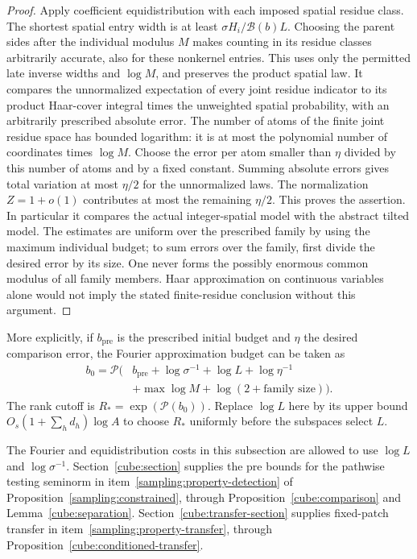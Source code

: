 \begin{proof}
Apply coefficient equidistribution with each imposed spatial residue class.
The shortest spatial entry width is at least
$\sigma H_i/\mathcal B(b)L$.  Choosing the parent sides after the
individual modulus $M$ makes counting in its residue classes arbitrarily
accurate, also for these nonkernel entries.  This uses only the permitted
late inverse widths and $\log M$, and preserves the product spatial law.
It compares the unnormalized expectation of every joint residue indicator
to its product Haar-cover integral times the unweighted spatial probability,
with an arbitrarily prescribed absolute error.  The number of atoms of
the finite joint residue space has bounded logarithm: it is at most the
polynomial number of coordinates times $\log M$.  Choose the error per atom smaller than
$\eta$ divided by this number of atoms and by a fixed constant.
Summing absolute errors gives total variation at most $\eta/2$ for the
unnormalized laws.  The normalization $Z=1+o(1)$ contributes at most the
remaining $\eta/2$.  This proves the assertion.  In particular it compares
the actual integer-spatial model with the abstract tilted model.  The
estimates are uniform over the prescribed family by using the maximum
individual budget; to sum errors over the family, first divide the desired
error by its size.  One never forms the possibly enormous common modulus
of all family members.  Haar approximation on continuous variables alone
would not imply the stated finite-residue conclusion without this argument.
\end{proof}

More explicitly, if $b_{\mathrm{pre}}$ is the prescribed initial budget
and $\eta$ the desired comparison error, the Fourier approximation budget
can be taken as
\[
 \begin{aligned}
 b_0=\mathcal P\bigl(&b_{\mathrm{pre}}+\log\sigma^{-1}
             +\log L+\log\eta^{-1}\\
             &+\max\log M+\log(2+\text{family size})\bigr).
 \end{aligned}
\]
The rank cutoff is $R_*=\exp(\mathcal P(b_0))$.  Replace $\log L$ here
by its upper bound $O_s(1+\sum_hd_h)\log A$ to choose $R_*$ uniformly
before the subspaces select $L$.

The Fourier and equidistribution costs in this subsection are allowed to
use $\log L$ and $\log\sigma^{-1}$.  Section~\ref{cube:section} supplies the
pre bounds for the pathwise testing seminorm in
item~\ref{sampling:property-detection} of
Proposition~\ref{sampling:constrained}, through
Proposition~\ref{cube:comparison} and Lemma~\ref{cube:separation}.
Section~\ref{cube:transfer-section} supplies fixed-patch transfer in
item~\ref{sampling:property-transfer}, through
Proposition~\ref{cube:conditioned-transfer}.
